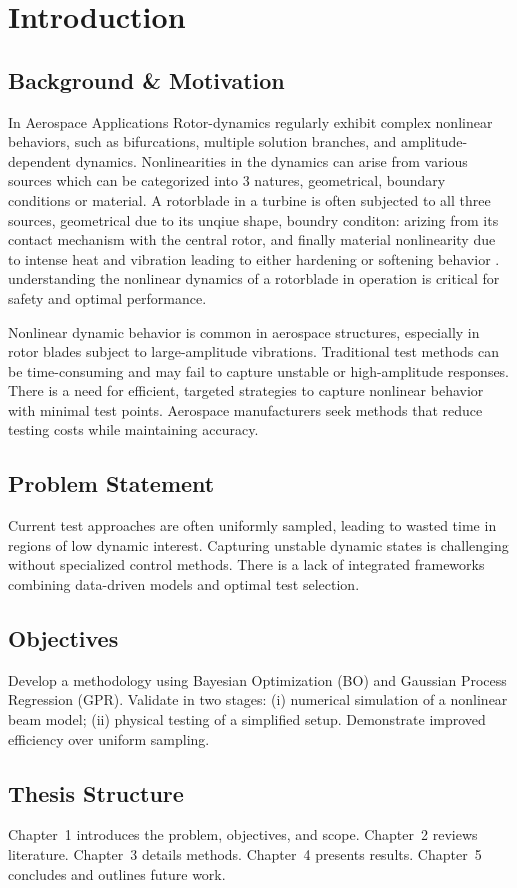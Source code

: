\chapter{Introduction}

\section{Background \& Motivation}
In Aerospace Applications Rotor-dynamics regularly exhibit complex nonlinear behaviors, such as bifurcations, multiple solution branches, and amplitude-dependent dynamics. Nonlinearities in the dynamics can arise from various sources which can be categorized into 3 natures, geometrical, boundary conditions or material. A rotorblade in a turbine is often subjected to all three sources, geometrical due to its unqiue shape, boundry conditon: arizing from its contact mechanism with the central rotor, and finally material nonlinearity due to intense heat and vibration leading to either hardening or softening behavior
\cite{akayContinuationAnalysisNonlinear2021a, chipatoEffectGravityinducedAsymmetry2018, varneyNonlinearPhenomenaBifurcations2015}. understanding the nonlinear dynamics of a rotorblade in operation is critical for safety and optimal performance.

Nonlinear dynamic behavior is common in aerospace structures, especially in rotor blades subject to large-amplitude vibrations.
Traditional test methods can be time-consuming and may fail to capture unstable or high-amplitude responses.
There is a need for efficient, targeted strategies to capture nonlinear behavior with minimal test points.
Aerospace manufacturers seek methods that reduce testing costs while maintaining accuracy.

\section{Problem Statement}
Current test approaches are often uniformly sampled, leading to wasted time in regions of low dynamic interest.
Capturing unstable dynamic states is challenging without specialized control methods.
There is a lack of integrated frameworks combining data-driven models and optimal test selection.

\section{Objectives}
Develop a methodology using Bayesian Optimization (BO) and Gaussian Process Regression (GPR).
Validate in two stages: (i) numerical simulation of a nonlinear beam model; (ii) physical testing of a simplified setup.
Demonstrate improved efficiency over uniform sampling.

\section{Thesis Structure}
Chapter~1 introduces the problem, objectives, and scope.
Chapter~2 reviews literature.
Chapter~3 details methods.
Chapter~4 presents results.
Chapter~5 concludes and outlines future work.

